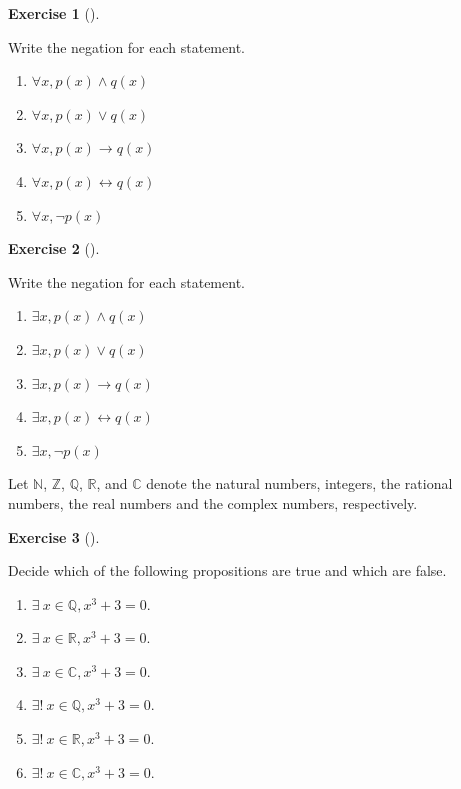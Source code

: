 \documentclass[
  letterpaper,
  10pt,
  reqno,
  twopage,
  openany]{book}
\providecommand{\tightlist}{%
  \setlength{\itemsep}{0pt}\setlength{\parskip}{0pt}}\usepackage{longtable,booktabs,array}
\theoremstyle{plain}
\theoremstyle{definition}
\newtheorem{exercise}{Exercise}[chapter]
\theoremstyle{definition}
\theoremstyle{definition}
\theoremstyle{plain}
\theoremstyle{plain}
\theoremstyle{remark}
\begin{document}
\leavevmode{}%
\begin{exercise}[]\label{exr-forall-negation-for-each-statement}

Write the negation for each statement.

\begin{enumerate}
\def\labelenumi{\arabic{enumi}.}
\tightlist
\item
  \(\forall x, p(x) \land q(x)\)
\item
  \(\forall x, p(x)\lor q(x)\)
\item
  \(\forall x, p(x)\rightarrow q(x)\)
\item
  \(\forall x, p(x)\leftrightarrow q(x)\)
\item
  \(\forall x, \neg p(x)\)
\end{enumerate}

\end{exercise}

\leavevmode{}%
\begin{exercise}[]\label{exr-exists-negation-for-each-statement}

Write the negation for each statement.

\begin{enumerate}
\def\labelenumi{\arabic{enumi}.}
\tightlist
\item
  \(\exists x, p(x) \land q(x)\)
\item
  \(\exists x, p(x)\lor q(x)\)
\item
  \(\exists x, p(x)\rightarrow q(x)\)
\item
  \(\exists x, p(x)\leftrightarrow q(x)\)
\item
  \(\exists x, \neg p(x)\)
\end{enumerate}

\end{exercise}

Let \(\mathbb{N}\), \(\mathbb{Z}\), \(\mathbb{Q}\), \(\mathbb{R}\), and
\(\mathbb{C}\) denote the natural numbers, integers, the rational
numbers, the real numbers and the complex numbers, respectively.

\leavevmode{}%
\begin{exercise}[]\label{exr-exists-true-false}

Decide which of the following propositions are true and which are false.

\begin{enumerate}
\def\labelenumi{\arabic{enumi}.}
\tightlist
\item
  \(\exists \ x\in \mathbb{Q}, x^3+3=0.\)
\item
  \(\exists \ x\in \mathbb{R}, x^3+3=0.\)
\item
  \(\exists \ x\in \mathbb{C}, x^3+3=0.\)
\item
  \(\exists! \ x\in \mathbb{Q}, x^3+3=0.\)
\item
  \(\exists! \ x\in \mathbb{R}, x^3+3=0.\)
\item
  \(\exists! \ x\in \mathbb{C}, x^3+3=0.\)
\end{enumerate}

\end{exercise}
\end{document}
